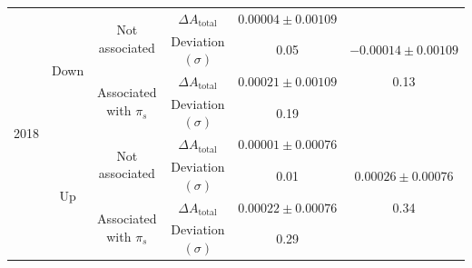 \documentclass{article}
\begin{document}
\begin{center}
\begin{tabular}{c|c|c|c|c|c}
                        \multirow{8}{*}{2018} & \multirow{4}{*}{Down} & \multirow{2}{*}{Not associated} & $\Delta A_\text{total}$ & $0.00004\pm 0.00109$& \\
                        & & & Deviation $(\sigma)$ & 0.05& $-0.00014\pm 0.00109$\\
                        \cline{3-5}
                        & & \multirow{2}{*}{Associated with $\pi_s$} & $\Delta A_\text{total}$ & $0.00021\pm 0.00109$& 0.13\\
                        & & & Deviation $(\sigma)$ & 0.19& \\
                        \cline{2-6}
                        & \multirow{4}{*}{Up} & \multirow{2}{*}{Not associated} & $\Delta A_\text{total}$ & $0.00001\pm 0.00076$& \\
                        & & & Deviation $(\sigma)$ & 0.01& $0.00026\pm 0.00076$\\
                        \cline{3-5}
                        & & \multirow{2}{*}{Associated with $\pi_s$} & $\Delta A_\text{total}$ & $0.00022\pm 0.00076$& 0.34\\
                        & & & Deviation $(\sigma)$ & 0.29& \\
                        \hline
                \end{tabular}
                \label{tab:all}
        \end{center}
\end{document}
